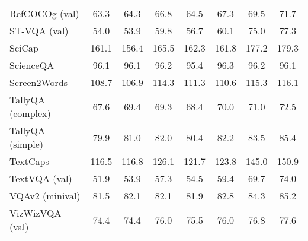 \begin{tabular}{lccccccc}
RefCOCOg (val) & \phantom{-}\phantom{0}63.3 & \phantom{-}\phantom{0}64.3 & \phantom{-}\phantom{0}66.8 & \phantom{-}\phantom{0}64.5 & \phantom{-}\phantom{0}67.3 & \phantom{-}\phantom{0}69.5 & \phantom{-}\phantom{0}71.7 \\
ST-VQA (val) & \phantom{-}\phantom{0}54.0 & \phantom{-}\phantom{0}53.9 & \phantom{-}\phantom{0}59.8 & \phantom{-}\phantom{0}56.7 & \phantom{-}\phantom{0}60.1 & \phantom{-}\phantom{0}75.0 & \phantom{-}\phantom{0}77.3 \\
SciCap & \phantom{-}161.1 & \phantom{-}156.4 & \phantom{-}165.5 & \phantom{-}162.3 & \phantom{-}161.8 & \phantom{-}177.2 & \phantom{-}179.3 \\
ScienceQA & \phantom{-}\phantom{0}96.1 & \phantom{-}\phantom{0}96.1 & \phantom{-}\phantom{0}96.2 & \phantom{-}\phantom{0}95.4 & \phantom{-}\phantom{0}96.3 & \phantom{-}\phantom{0}96.2 & \phantom{-}\phantom{0}96.1 \\
Screen2Words & \phantom{-}108.7 & \phantom{-}106.9 & \phantom{-}114.3 & \phantom{-}111.3 & \phantom{-}110.6 & \phantom{-}115.3 & \phantom{-}116.1 \\
TallyQA (complex) & \phantom{-}\phantom{0}67.6 & \phantom{-}\phantom{0}69.4 & \phantom{-}\phantom{0}69.3 & \phantom{-}\phantom{0}68.4 & \phantom{-}\phantom{0}70.0 & \phantom{-}\phantom{0}71.0 & \phantom{-}\phantom{0}72.5 \\
TallyQA (simple) & \phantom{-}\phantom{0}79.9 & \phantom{-}\phantom{0}81.0 & \phantom{-}\phantom{0}82.0 & \phantom{-}\phantom{0}80.4 & \phantom{-}\phantom{0}82.2 & \phantom{-}\phantom{0}83.5 & \phantom{-}\phantom{0}85.4 \\
TextCaps & \phantom{-}116.5 & \phantom{-}116.8 & \phantom{-}126.1 & \phantom{-}121.7 & \phantom{-}123.8 & \phantom{-}145.0 & \phantom{-}150.9 \\
TextVQA (val) & \phantom{-}\phantom{0}51.9 & \phantom{-}\phantom{0}53.9 & \phantom{-}\phantom{0}57.3 & \phantom{-}\phantom{0}54.5 & \phantom{-}\phantom{0}59.4 & \phantom{-}\phantom{0}69.7 & \phantom{-}\phantom{0}74.0 \\
VQAv2 (minival) & \phantom{-}\phantom{0}81.5 & \phantom{-}\phantom{0}82.1 & \phantom{-}\phantom{0}82.1 & \phantom{-}\phantom{0}81.9 & \phantom{-}\phantom{0}82.8 & \phantom{-}\phantom{0}84.3 & \phantom{-}\phantom{0}85.2 \\
VizWizVQA (val) & \phantom{-}\phantom{0}74.4 & \phantom{-}\phantom{0}74.4 & \phantom{-}\phantom{0}76.0 & \phantom{-}\phantom{0}75.5 & \phantom{-}\phantom{0}76.0 & \phantom{-}\phantom{0}76.8 & \phantom{-}\phantom{0}77.6 \\

\end{tabular}

